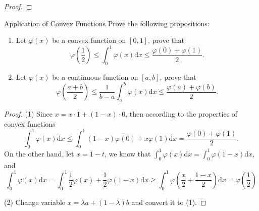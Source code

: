 \begin{proof}
  
\end{proof}

\begin{example}{Application of Convex Functions}{}
  Prove the following propositions:
  \begin{enumerate}
  \item Let $\varphi(x)$ be a convex function on $[0, 1]$, prove that
    \begin{equation}
      \varphi (\frac{1}{2}) \leq \int_0^1\varphi(x)\mathrm{d} x \leq \frac{\varphi(0) + \varphi(1)}{2}.
    \end{equation}
  \item Let $\varphi(x)$ be a continuous function on $[a, b]$, prove that
    \begin{equation}
      \varphi (\frac{a+b}{2}) \leq \frac{1}{b-a} \int_a^b \varphi(x)\mathrm{d} x \leq \frac{\varphi(a) + \varphi(b)}{2}.
    \end{equation}
  \end{enumerate}
\end{example}

\begin{proof}
  (1) Since $x = x \cdot 1 + (1 - x) \cdot 0$, then according to the properties
  of convex functions
  \begin{equation}
    \int_0^1 \varphi(x)\mathrm{d} x \leq
    \int_0^1 (1-x)\varphi(0) + x\varphi(1)\mathrm{d} x = 
    \frac{\varphi(0) + \varphi(1)}{2}.
  \end{equation}
  On the other hand, let $x = 1 - t$,
  we know that $\int_0^1 \varphi(x)\mathrm{d} x = \int_0^1
  \varphi(1-x)\mathrm{d} x$, and
  \begin{equation}
    \int_0^1\varphi(x)\mathrm{d}x=\int_0^1\frac{1}{2}\varphi(x)+\frac{1}{2}\varphi(1-x)\mathrm{d}x\geq\int_0^1\varphi\left(\frac{x}{2}+\frac{1-x}{2}\right)\mathrm{d}x=\varphi\left(\frac{1}{2}\right)
  \end{equation}

  (2) Change variable $x = \lambda a + (1-\lambda)b$ and convert it to (1).
\end{proof}



